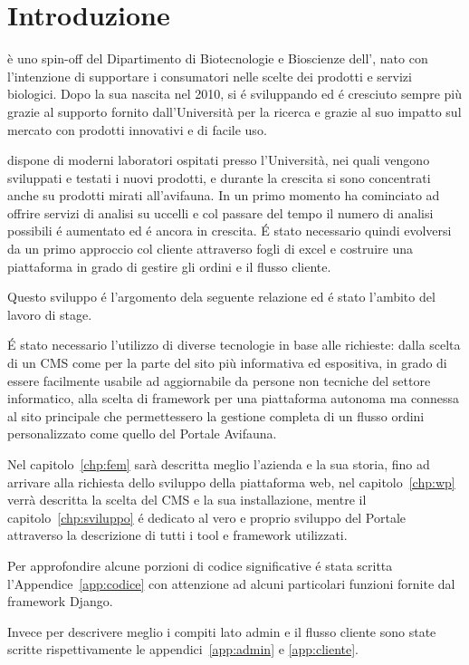 \chapter{Introduzione} 

\textbf{\femsrl} è uno spin-off del Dipartimento di Biotecnologie e Bioscienze dell'{\unimib}, nato con l'intenzione di supportare i consumatori nelle scelte dei prodotti e servizi biologici. Dopo la sua nascita nel 2010, si é sviluppando ed é cresciuto sempre più grazie al supporto fornito dall'Università per la ricerca e grazie al suo impatto sul mercato con prodotti innovativi e di facile uso.

{\fem} dispone di moderni laboratori ospitati presso l’Università, nei quali vengono sviluppati e testati i nuovi prodotti, e durante la crescita si sono concentrati anche su prodotti mirati all'avifauna. In un primo momento ha cominciato ad offrire servizi di analisi su uccelli e col passare del tempo il numero di analisi possibili é aumentato ed é ancora in crescita. É stato necessario quindi evolversi da un primo approccio col cliente attraverso fogli di excel e costruire una piattaforma in grado di gestire gli ordini e il flusso cliente.

Questo sviluppo é l'argomento dela seguente relazione ed é stato l'ambito del lavoro di stage.

É stato necessario l'utilizzo di diverse tecnologie in base alle richieste: dalla scelta di un CMS come \emph{{\wp}} per la parte del sito più informativa ed espositiva, in grado di essere facilmente usabile ad aggiornabile da persone non tecniche del settore informatico, alla scelta di framework per una piattaforma autonoma ma connessa al sito principale che permettessero la gestione completa di un flusso ordini personalizzato come quello del Portale Avifauna.
  
Nel capitolo~\ref{chp:fem} sarà descritta meglio l'azienda {\femsrl} e la sua storia, fino ad arrivare alla richiesta dello sviluppo della piattaforma web, nel capitolo~\ref{chp:wp} verrà descritta la scelta del CMS {\wp} e la sua installazione, mentre il capitolo~\ref{chp:sviluppo} é dedicato al vero e proprio sviluppo del Portale attraverso la descrizione di tutti i tool e framework utilizzati.

Per approfondire alcune porzioni di codice significative é stata scritta l'Appendice~\ref{app:codice} con attenzione ad alcuni particolari funzioni fornite dal framework Django.

Invece per descrivere meglio i compiti lato admin e il flusso cliente sono state scritte rispettivamente le appendici~\ref{app:admin} e \ref{app:cliente}.
